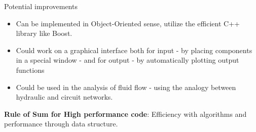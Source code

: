\documentclass[xcolor=dvipsnames]{beamer}
\begin{document}
\begin{frame}{ Potential improvements}
	\begin{itemize}
		\item Can be implemented in Object-Oriented sense, utilize the efficient C++ library like Boost.
		\item Could work on a graphical interface both for input - by placing components in a special window - and for output - by automatically plotting output functions
		\item Could be used in the analysis of fluid flow - using the analogy between hydraulic and circuit networks.
	\end{itemize}
\textbf{Rule of Sum for High performance code}: Efficiency with algorithms and performance through data structure.
\end{frame}

%



\end{document}
